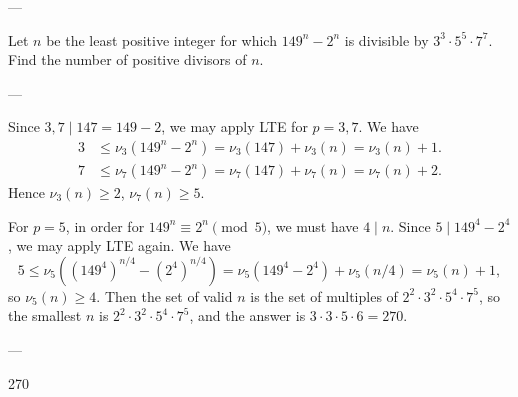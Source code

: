 
---

Let $n$ be the least positive integer for which $149^n-2^n$ is divisible by $3^3\cdot5^5\cdot7^7$. Find the number of positive divisors of $n$.

---

Since $3,7\mid147=149-2$, we may apply LTE for $p=3,7$. We have
\begin{align*}
    3&\le\nu_3\left(149^n-2^n\right)=\nu_3(147)+\nu_3(n)=\nu_3(n)+1.\\
    7&\le\nu_7\left(149^n-2^n\right)=\nu_7(147)+\nu_7(n)=\nu_7(n)+2.
\end{align*}
Hence $\nu_3(n)\ge2$, $\nu_7(n)\ge5$.

For $p=5$, in order for $149^n\equiv2^n\pmod5$, we must have $4\mid n$. Since $5\mid149^4-2^4$, we may apply LTE again. We have
\[5\le\nu_5\left( \left(149^4\right)^{n/4}-\left(2^4\right)^{n/4}\right)=\nu_5\left(149^4-2^4\right)+\nu_5(n/4)=\nu_5(n)+1,\]
so $\nu_5(n)\ge4$. Then the set of valid $n$ is the set of multiples of $2^2\cdot3^2\cdot5^4\cdot7^5$, so the smallest $n$ is $2^2\cdot3^2\cdot5^4\cdot7^5$, and the answer is $3\cdot3\cdot5\cdot6=270$.

---

270
